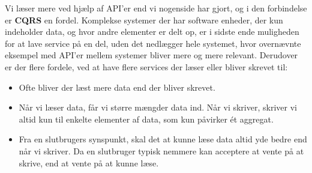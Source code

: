 Vi læser mere ved hjælp af API'er end vi nogenside har gjort, og i den forbindelse er \textbf{CQRS} en fordel. Komplekse systemer der har software enheder, der kun indeholder data, og hvor andre elementer er delt op, er i sidste ende muligheden for at lave service på en del, uden det nedlægger hele systemet, hvor overnævnte eksempel med API'er mellem systemer bliver mere og mere relevant. 
Derudover er der flere fordele, ved at have flere services der læser eller bliver skrevet til:
\begin{itemize}
    \item Ofte bliver der læst mere data end der bliver skrevet.
    \item Når vi læser data, får vi større mængder data ind. Når vi skriver, skriver vi altid kun til enkelte elementer af data, som kun påvirker ét aggregat.
    \item Fra en slutbrugers synspunkt, skal det at kunne læse data altid yde bedre end når vi skriver. Da en slutbruger typisk nemmere kan acceptere at vente på at skrive, end at vente på at kunne læse.
\end{itemize}

